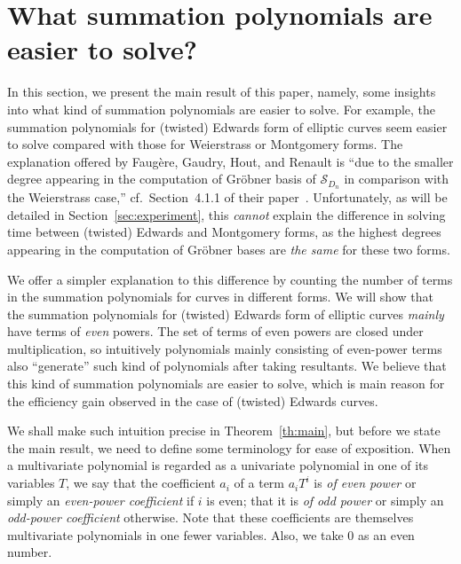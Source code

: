 \section{What summation polynomials are easier to solve?}
\label{sec:twisted-edwards-summation-polynomial}

In this section, we present the main result of this paper, namely,
some insights into what kind of summation polynomials are easier to
solve.
%
For example, the summation polynomials for (twisted) Edwards form of
elliptic curves seem easier to solve compared with those for
Weierstrass or Montgomery forms.
%
The explanation offered by Faug\`ere, Gaudry, Hout, and Renault is
``due to the smaller degree appearing in the computation of Gr\"obner
basis of $\mathscr S_{D_n}$ in comparison with the Weierstrass case,''
cf.~Section~4.1.1 of their
paper~\cite{DBLP:journals/joc/FaugereGHR14}.
%
Unfortunately, as will be detailed in Section~\ref{sec:experiment},
this \emph{cannot} explain the difference in solving time between
(twisted) Edwards and Montgomery forms, as the highest degrees
appearing in the computation of Gr\"obner bases are \emph{the same}
for these two forms.

We offer a simpler explanation to this difference by counting the
number of terms in the summation polynomials for curves in different
forms.
%
We will show that the summation polynomials for (twisted) Edwards form
of elliptic curves \emph{mainly} have terms of \emph{even} powers.
%
The set of terms of even powers are closed under multiplication, so
intuitively polynomials mainly consisting of even-power terms also
``generate'' such kind of polynomials after taking resultants.
%
We believe that this kind of summation polynomials are easier to
solve, which is main reason for the efficiency gain observed in the
case of (twisted) Edwards curves.

We shall make such intuition precise in Theorem~\ref{th:main}, but
before we state the main result, we need to define some terminology
for ease of exposition.
%
When a multivariate polynomial is regarded as a univariate polynomial
in one of its variables $T$, we say that the coefficient $a_i$ of a
term $a_iT^i$ is \emph{of even power} or simply an \emph{even-power
  coefficient} if $i$ is even; that it is \emph{of odd power} or
simply an \emph{odd-power coefficient} otherwise.
%
Note that these coefficients are themselves multivariate polynomials
in one fewer variables.
%
Also, we take 0 as an even number.

